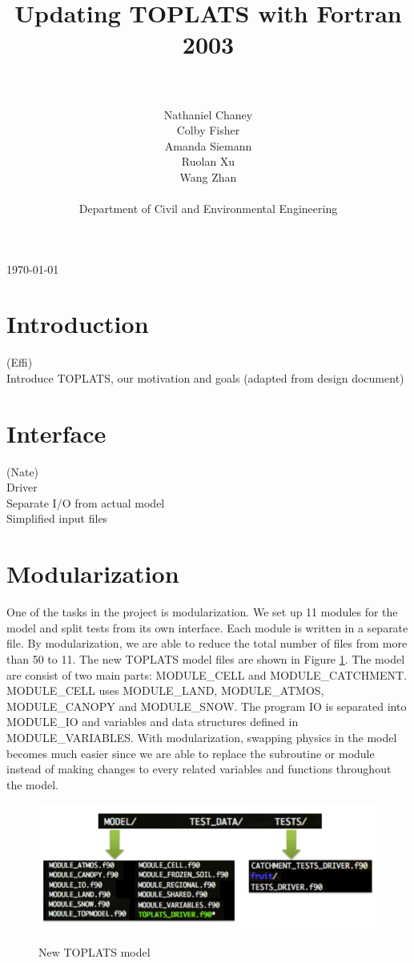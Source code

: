 \documentclass[pdftex,12pt,a4paper]{article}
\title{Updating TOPLATS with Fortran 2003}
\author{\\ \\ Nathaniel Chaney\\ Colby Fisher\\ Amanda Siemann\\ Ruolan Xu\\ Wang Zhan \\ \\ Department of Civil and Environmental Engineering}
\date{}
\begin{document}
\maketitle
\vfill
\begin{center}
{\large \today}
\end{center}

\newpage
\section{Introduction}
{(Effi)}
{\\ Introduce TOPLATS, our motivation and goals (adapted from design document)}

\section{Interface}
{(Nate)}
{\\ Driver}
{\\ Separate I/O from actual model}
{\\ Simplified input files}

\section{Modularization}
One of the tasks in the project is modularization. We set up 11 modules for the model and split tests from its own interface. Each module is written in a separate file. By modularization, we are able to reduce the total number of files from more than 50 to 11. The new TOPLATS model files are shown in Figure \ref{Modules1}. The model are consist of two main parts: MODULE\_CELL and MODULE\_CATCHMENT. MODULE\_CELL uses MODULE\_LAND, MODULE\_ATMOS, MODULE\_CANOPY and MODULE\_SNOW. The program IO is separated into MODULE\_IO and variables and data structures defined in MODULE\_VARIABLES. With modularization, swapping physics in the model becomes much easier since we are able to replace the subroutine or module instead of making changes to every related variables and functions throughout the model.

\begin{figure}[h]
	\centering
	\includegraphics[width=4.5in]{Figures/Modules1.png}
	\label{Modules1}
	\caption{New TOPLATS model}
\end{figure}
\end{document}
